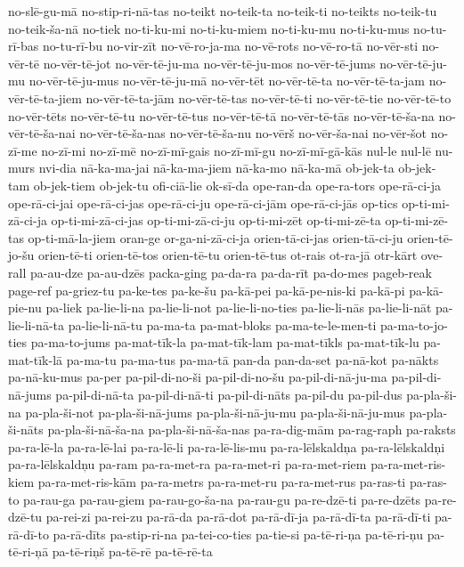 {no-slē-gu-mā
no-stip-ri-nā-tas
no-teikt
no-teik-ta
no-teik-ti
no-teikts
no-teik-tu
no-teik-ša-nā
no-tiek
no-ti-ku-mi
no-ti-ku-miem
no-ti-ku-mu
no-ti-ku-mus
no-tu-rī-bas
no-tu-rī-bu
no-vir-zīt
no-vē-ro-ja-ma
no-vē-rots
no-vē-ro-tā
no-vēr-sti
no-vēr-tē
no-vēr-tē-jot
no-vēr-tē-ju-ma
no-vēr-tē-ju-mos
no-vēr-tē-jums
no-vēr-tē-ju-mu
no-vēr-tē-ju-mus
no-vēr-tē-ju-mā
no-vēr-tēt
no-vēr-tē-ta
no-vēr-tē-ta-jam
no-vēr-tē-ta-jiem
no-vēr-tē-ta-jām
no-vēr-tē-tas
no-vēr-tē-ti
no-vēr-tē-tie
no-vēr-tē-to
no-vēr-tēts
no-vēr-tē-tu
no-vēr-tē-tus
no-vēr-tē-tā
no-vēr-tē-tās
no-vēr-tē-ša-na
no-vēr-tē-ša-nai
no-vēr-tē-ša-nas
no-vēr-tē-ša-nu
no-vērš
no-vēr-ša-nai
no-vēr-šot
no-zī-me
no-zī-mi
no-zī-mē
no-zī-mī-gais
no-zī-mī-gu
no-zī-mī-gā-kās
nul-le
nul-lē
nu-murs
nvi-dia
nā-ka-ma-jai
nā-ka-ma-jiem
nā-ka-mo
nā-ka-mā
ob-jek-ta
ob-jek-tam
ob-jek-tiem
ob-jek-tu
ofi-ciā-lie
ok-sī-da
ope-ran-da
ope-ra-tors
ope-rā-ci-ja
ope-rā-ci-jai
ope-rā-ci-jas
ope-rā-ci-ju
ope-rā-ci-jām
ope-rā-ci-jās
op-tics
op-ti-mi-zā-ci-ja
op-ti-mi-zā-ci-jas
op-ti-mi-zā-ci-ju
op-ti-mi-zēt
op-ti-mi-zē-ta
op-ti-mi-zē-tas
op-ti-mā-la-jiem
oran-ge
or-ga-ni-zā-ci-ja
orien-tā-ci-jas
orien-tā-ci-ju
orien-tē-jo-šu
orien-tē-ti
orien-tē-tos
orien-tē-tu
orien-tē-tus
ot-rais
ot-ra-jā
otr-kārt
ove-rall
pa-au-dze
pa-au-dzēs
packa-ging
pa-da-ra
pa-da-rīt
pa-do-mes
pageb-reak
page-ref
pa-griez-tu
pa-ke-tes
pa-ke-šu
pa-kā-pei
pa-kā-pe-nis-ki
pa-kā-pi
pa-kā-pie-nu
pa-liek
pa-lie-li-na
pa-lie-li-not
pa-lie-li-no-ties
pa-lie-li-nās
pa-lie-li-nāt
pa-lie-li-nā-ta
pa-lie-li-nā-tu
pa-ma-ta
pa-mat-bloks
pa-ma-te-le-men-ti
pa-ma-to-jo-ties
pa-ma-to-jums
pa-mat-tīk-la
pa-mat-tīk-lam
pa-mat-tīkls
pa-mat-tīk-lu
pa-mat-tīk-lā
pa-ma-tu
pa-ma-tus
pa-ma-tā
pan-da
pan-da-set
pa-nā-kot
pa-nākts
pa-nā-ku-mus
pa-per
pa-pil-di-no-ši
pa-pil-di-no-šu
pa-pil-di-nā-ju-ma
pa-pil-di-nā-jums
pa-pil-di-nā-ta
pa-pil-di-nā-ti
pa-pil-di-nāts
pa-pil-du
pa-pil-dus
pa-pla-ši-na
pa-pla-ši-not
pa-pla-ši-nā-jums
pa-pla-ši-nā-ju-mu
pa-pla-ši-nā-ju-mus
pa-pla-ši-nāts
pa-pla-ši-nā-ša-na
pa-pla-ši-nā-ša-nas
pa-ra-dig-mām
pa-rag-raph
pa-raksts
pa-ra-lē-la
pa-ra-lē-lai
pa-ra-lē-li
pa-ra-lē-lis-mu
pa-ra-lēlskaldņa
pa-ra-lēlskaldņi
pa-ra-lēlskaldņu
pa-ram
pa-ra-met-ra
pa-ra-met-ri
pa-ra-met-riem
pa-ra-met-ris-kiem
pa-ra-met-ris-kām
pa-ra-metrs
pa-ra-met-ru
pa-ra-met-rus
pa-ras-ti
pa-ras-to
pa-rau-ga
pa-rau-giem
pa-rau-go-ša-na
pa-rau-gu
pa-re-dzē-ti
pa-re-dzēts
pa-re-dzē-tu
pa-rei-zi
pa-rei-zu
pa-rā-da
pa-rā-dot
pa-rā-dī-ja
pa-rā-dī-ta
pa-rā-dī-ti
pa-rā-dī-to
pa-rā-dīts
pa-stip-ri-na
pa-tei-co-ties
pa-tie-si
pa-tē-ri-ņa
pa-tē-ri-ņu
pa-tē-ri-ņā
pa-tē-riņš
pa-tē-rē
pa-tē-rē-ta
}
